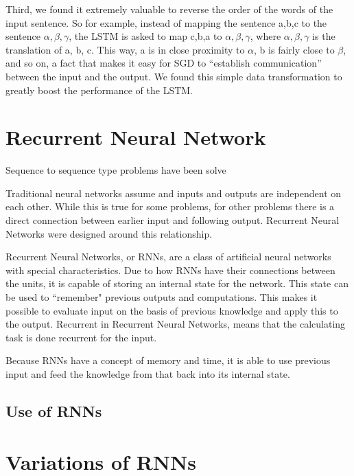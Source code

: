 Third, we found it extremely valuable to reverse the order of the words of the input sentence. So for example, instead of mapping the sentence a,b,c to the sentence $\alpha, \beta, \gamma$, the LSTM is asked to map c,b,a to $\alpha, \beta, \gamma$, where $\alpha, \beta, \gamma$ is the translation of a, b, c. This way, a is in close proximity to $\alpha$, b is fairly close to $\beta$, and so on, a fact that makes it easy for SGD to “establish communication” between the input and the output. We found this simple data transformation to greatly boost the performance of the LSTM.


\section{Recurrent Neural Network}
Sequence to sequence type problems have been solve

Traditional neural networks assume and inputs and outputs are independent on each other. While this is true for some problems, for other problems there is a direct connection between earlier input and following output. Recurrent Neural Networks were designed around this relationship.

Recurrent Neural Networks, or RNNs, are a class of artificial neural networks with special characteristics. Due to how RNNs have their connections between the units, it is capable of storing an internal state for the network. This state can be used to ``remember" previous outputs and computations. This makes it possible to evaluate input on the basis of previous knowledge and apply this to the output. Recurrent in Recurrent Neural Networks, means that the calculating task is done recurrent for the input.


Because RNNs have a concept of memory and time, it is able to use previous input and feed the knowledge from that back into its internal state. 

\subsection{Use of RNNs}


\section{Variations of RNNs}

